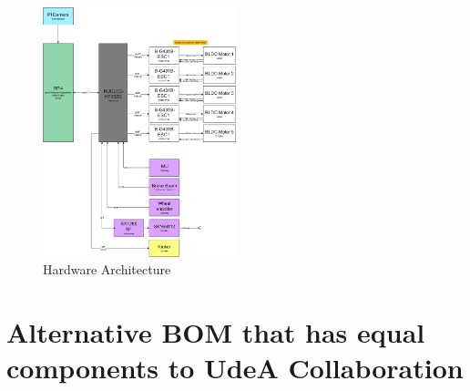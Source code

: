 \documentclass[a4paper,8pt]{article}
\begin{document}
  \begin{figure}[H]
    \begin{center}
      \includegraphics[width=0.5\textwidth]{Hardware_architecture.png}
    \end{center}
    \caption{Hardware Architecture}
    \label{fig:hardware_architecture}
  \end{figure}


  \section{Alternative BOM that has equal components to UdeA
    Collaboration}
\end{document}
